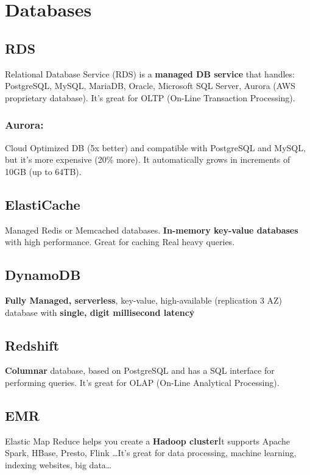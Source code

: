 \section{Databases}\label{sec:databases}

\subsection{RDS}\label{subsec:rds}
Relational Database Service (RDS) is a \textbf{managed DB service} that handles: PostgreSQL, MySQL, MariaDB, Oracle, Microsoft SQL Server, Aurora (AWS proprietary database).
It's great for OLTP (On-Line Transaction Processing).

\subsubsection{Aurora:}
Cloud Optimized DB (5x better) and compatible with PostgreSQL and MySQL, but it's more expensive (20\% more).
It automatically grows in increments of 10GB (up to 64TB).

\subsection{ElastiCache}\label{subsec:elasticache}
Managed Redis or Memcached databases. \textbf{In-memory key-value databases} with high performance.
Great for  caching Real heavy queries.

\subsection{DynamoDB}\label{subsec:dynamodb}
\textbf{Fully Managed, serverless}, key-value, high-available (replication 3 AZ) database with \textbf{single, digit millisecond latency}\.

\subsection{Redshift}\label{subsec:redshift}
\textbf{Columnar} database, based on PostgreSQL and has a SQL interface for performing queries.
It's great for  OLAP (On-Line Analytical Processing).

\subsection{EMR}\label{subsec:emr}
Elastic Map Reduce helps you create a \textbf{Hadoop cluster}\.
It supports Apache Spark, HBase, Presto, Flink \ldots It's great for data processing, machine learning, indexing websites, big data\ldots

